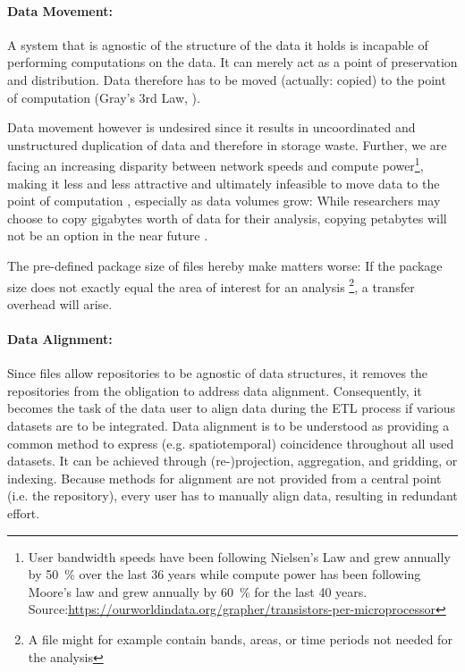 \documentclass[a4paper,10pt]{article}
\begin{document}
\paragraph{Data Movement:}
A system that is agnostic of the structure of the data it holds is incapable of performing computations on the data. 
It can merely act as a point of preservation and distribution. Data therefore has to be moved (actually: copied) to the point of computation (Gray's 3rd Law, \cite{Szalay2009}).

Data movement however is undesired since it results in uncoordinated and unstructured duplication of data and therefore in storage waste.
Further, we are facing an increasing disparity between network speeds and compute power\footnote{User bandwidth speeds have been following Nielsen's Law \citep{Nielsen1998} and grew annually by \SI{50}{\percent} over the last 36 years while compute power has been following Moore's law \citep{Moore1975} and grew annually by \SI{60}{\percent} for the last 40 years. Source:\url{https://ourworldindata.org/grapher/transistors-per-microprocessor}}, making it less and less attractive and ultimately infeasible to move data to the point of computation \citep{Hey2009}, especially as data volumes grow: While researchers may choose to copy gigabytes worth of data for their analysis, copying petabytes will not be an option in the near future \citep{Szalay2006}.

The pre-defined package size of files hereby make matters worse: If the package size does not exactly equal the area of
interest for an analysis \citep{Gray2002}\footnote{A file might for example contain bands, areas, or time periods not needed for the analysis}, a
transfer overhead will arise.

\paragraph{Data Alignment:}
Since files allow repositories to be agnostic of data structures, it removes the repositories from the obligation to address data alignment.
Consequently, it becomes the task of the data user to align data during the \gls{ETL} process if various datasets are to be integrated.
Data alignment is to be understood as providing a common method to express (e.g. spatiotemporal) coincidence throughout all used datasets.
It can be achieved through (re-)projection, aggregation, and gridding, or indexing.
Because methods for alignment are not provided from a central point (i.e. the repository), every user has to manually align data, resulting in redundant effort.
\end{document}
